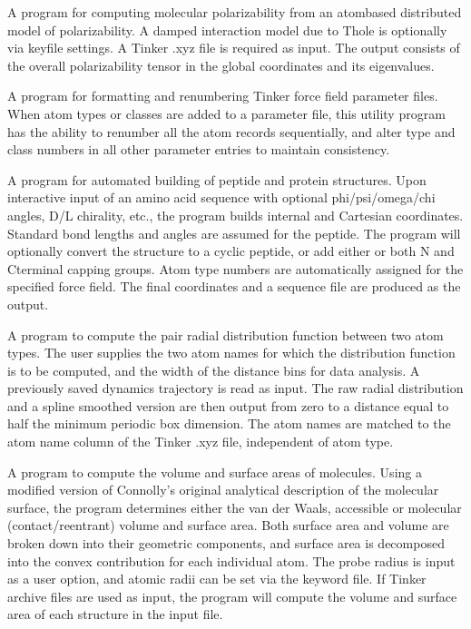 \documentclass[letterpaper,11pt,english]{sphinxmanual}
\begin{document}

A program for computing molecular polarizability from an atom\sphinxhyphen{}based distributed model of polarizability. A damped interaction model due to Thole is optionally via keyfile settings. A Tinker .xyz file is required as input. The output consists of the overall polarizability tensor in the global coordinates and its eigenvalues.


A program for formatting and renumbering Tinker force field parameter files. When atom types or classes are added to a parameter file, this utility program has the ability to renumber all the atom records sequentially, and alter type and class numbers in all other parameter entries to maintain consistency.


A program for automated building of peptide and protein structures. Upon interactive input of an amino acid sequence with optional phi/psi/omega/chi angles, D/L chirality, etc., the program builds internal and Cartesian coordinates. Standard bond lengths and angles are assumed for the peptide. The program will optionally convert the structure to a cyclic peptide, or add either or both N\sphinxhyphen{} and C\sphinxhyphen{}terminal capping groups. Atom type numbers are automatically assigned for the specified force field. The final coordinates and a sequence file are produced as the output.


A program to compute the pair radial distribution function between two atom types. The user supplies the two atom names for which the distribution function is to be computed, and the width of the distance bins for data analysis. A previously saved dynamics trajectory is read as input. The raw radial distribution and a spline smoothed version are then output from zero to a distance equal to half the minimum periodic box dimension. The atom names are matched to the atom name column of the Tinker .xyz file, independent of atom type.


A program to compute the volume and surface areas of molecules. Using a modified version of Connolly’s original analytical description of the molecular surface, the program determines either the van der Waals, accessible or molecular (contact/reentrant) volume and surface area. Both surface area and volume are broken down into their geometric components, and surface area is decomposed into the convex contribution for each individual atom. The probe radius is input as a user option, and atomic radii can be set via the keyword file. If Tinker archive files are used as input, the program will compute the volume and surface area of each structure in the input file.
\end{document}
